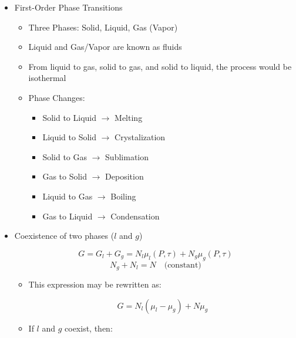 \begin{itemize}

  \item First-Order Phase Transitions

    \begin{itemize}

      \item Three Phases: Solid, Liquid, Gas (Vapor)

      \item Liquid and Gas/Vapor are known as fluids

      \item From liquid to gas, solid to gas, and solid to liquid, the process would be isothermal

      \item Phase Changes:

        \begin{itemize}

          \item Solid to Liquid $\to$ Melting

          \item Liquid to Solid $\to$ Crystalization

          \item Solid to Gas $\to$ Sublimation

          \item Gas to Solid $\to$ Deposition

          \item Liquid to Gas $\to$ Boiling

          \item Gas to Liquid $\to$ Condensation

        \end{itemize}

    \end{itemize}

  \item Coexistence of two phases ($l$ and $g$)

    $$G=G_l+G_g=N_l\mu_l(P,\tau)+N_g\mu_g(P,\tau)$$
    $$N_g+N_l=N\quad\text{(constant)}$$

    \begin{itemize}

      \item This expression may be rewritten as:

        $$G=N_l(\mu_l-\mu_g)+N\mu_g$$

      \item If $l$ and $g$ coexist, then:


\end{itemize}
\end{itemize}
